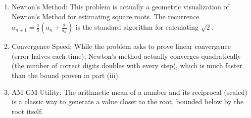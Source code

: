 \begin{takeaways}
\begin{enumerate}
    \item Newton's Method: This problem is actually a geometric visualization of Newton's Method 
    for estimating square roots. 
    The recurrence $a_{n+1} = \frac{1}{2}(a_n + \frac{2}{a_n})$ 
    is the standard algorithm for calculating $\sqrt{2}$.
    \item Convergence Speed: While the problem asks to prove linear convergence (error halves each time), 
    Newton's method actually converges quadratically 
    (the number of correct digits doubles with every step), 
    which is much faster than the bound proven in part (iii).

    \item AM-GM Utility: The arithmetic mean of a number and its reciprocal (scaled) 
    is a classic way to generate a value closer to the root, 
    bounded below by the root itself.
\end{enumerate}
\end{takeaways}


